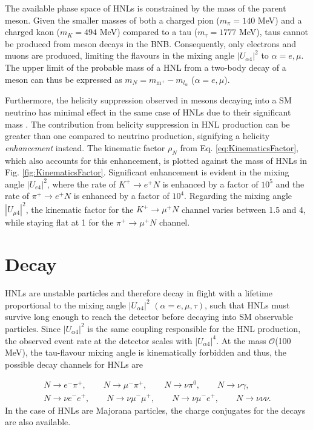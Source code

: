 The available phase space of HNLs is constrained by the mass of the parent meson.
Given the smaller masses of both a charged pion ($m_{\pi} = 140 $ MeV) and a charged kaon ($m_{K} = 494 $ MeV) compared to a tau ($m_{\tau}=1777 $ MeV), taus cannot be produced from meson decays in the BNB.
Consequently, only electrons and muons are produced, limiting the flavours in the mixing angle $|U_{\alpha4}|^{2}$ to $\alpha = e, \mu$.
The upper limit of the probable mass of a HNL from a two-body decay of a meson can thus be expressed as $m_{N} = m_{\text{m}^{+}} - m_{l_{\alpha}}$ ($\alpha=e,\mu$).

Furthermore, the helicity suppression observed in mesons decaying into a SM neutrino has minimal effect in the same case of HNLs due to their significant mass \cite{HNLKelly}.
The contribution from helicity suppression in HNL production can be greater than one compared to neutrino production, signifying a helicity \textit{enhancement} instead.
The kinematic factor $\rho_{N}$ from Eq. \ref{eq:KinematicsFactor}, which also accounts for this enhancement, is plotted against the mass of HNLs in Fig. \ref{fig:KinematicsFactor}.
Significant enhancement is evident in the mixing angle $|U_{e4}|^{2}$, where the rate of $K^{+}\rightarrow e^{+}N$ is enhanced by a factor of $10^{5}$ and the rate of $\pi^{+}\rightarrow e^{+}N$ is enhanced by a factor of $10^{4}$.
Regarding the mixing angle $|U_{\mu4}|^{2}$, the kinematic factor for the $K^{+}\rightarrow \mu^{+}N$ channel varies between 1.5 and 4, while staying flat at 1 for the $\pi^{+}\rightarrow \mu^{+}N$ channel.

\section{Decay}
\label{sec2Decay}

HNLs are unstable particles and therefore decay in flight with a lifetime proportional to the mixing angle $|U_{\alpha4}|^{2}$ $(\alpha=e,\mu,\tau)$, such that HNLs must survive long enough to reach the detector before decaying into SM observable particles.
Since $|U_{\alpha4}|^{2}$ is the same coupling responsible for the HNL production, the observed event rate at the detector scales with $|U_{\alpha4}|^{4}$.
At the mass $\mathcal{O}$(100 MeV), the tau-flavour mixing angle is kinematically forbidden and thus, the possible decay channels for HNLs are \cite{SBNHNL}

\begin{equation}
\begin{split}
	N\rightarrow e^{-}\pi^{+},\qquad 
	N\rightarrow \mu^{-}\pi^{+},\qquad
	N\rightarrow \nu \pi^{0},\qquad 
	N\rightarrow \nu \gamma,\qquad \\ 
	N\rightarrow \nu e^{-} e^{+},\qquad 
	N\rightarrow \nu \mu^{-} \mu^{+},\qquad 
	N\rightarrow \nu \mu^{-}e^{+},\qquad
	N\rightarrow \nu \nu \nu. 
\end{split}
\end{equation}
In the case of HNLs are Majorana particles, the charge conjugates for the decays are also available.

